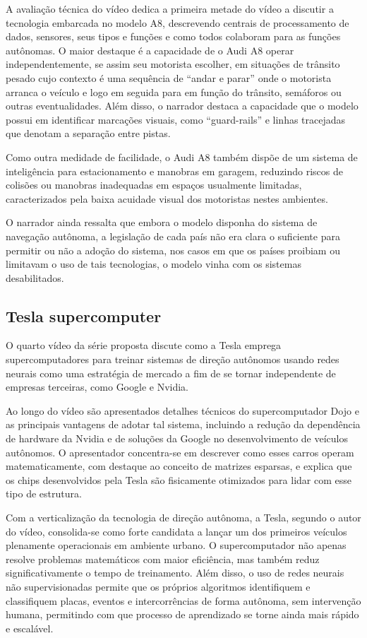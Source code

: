 A avaliação técnica do vídeo dedica a primeira metade do vídeo a discutir a tecnologia embarcada no modelo A8, descrevendo centrais de processamento de dados, sensores, seus tipos e funções e como todos colaboram para as funções autônomas. O maior destaque é a capacidade de o Audi A8 operar independentemente, se assim seu motorista escolher, em situações de trânsito pesado cujo contexto é uma sequência de ``andar e parar'' onde o motorista arranca o veículo e logo em seguida para em função do trânsito, semáforos ou outras eventualidades. Além disso, o narrador destaca a capacidade que o modelo possui em identificar marcações visuais, como ``guard-rails'' e linhas tracejadas que denotam a separação entre pistas.

Como outra medidade de facilidade, o Audi A8 também dispõe de um sistema de inteligência para estacionamento e manobras em garagem, reduzindo riscos de colisões ou manobras inadequadas em espaços usualmente limitadas, caracterizados pela baixa acuidade visual dos motoristas nestes ambientes.

O narrador ainda ressalta que embora o modelo disponha do sistema de navegação autônoma, a legislação de cada país não era clara o suficiente para permitir ou não a adoção do sistema, nos casos em que os países proibiam ou limitavam o uso de tais tecnologias, o modelo vinha com os sistemas desabilitados.

\subsection{Tesla supercomputer}

O quarto vídeo da série proposta \cite{dojo} discute como a Tesla emprega supercomputadores para treinar sistemas de direção autônomos usando redes neurais como uma estratégia de mercado a fim de se tornar independente de empresas terceiras, como Google e Nvidia.

Ao longo do vídeo são apresentados detalhes técnicos do supercomputador Dojo e as principais vantagens de adotar tal sistema, incluindo a redução da dependência de hardware da Nvidia e de soluções da Google no desenvolvimento de veículos autônomos. O apresentador concentra-se em descrever como esses carros operam matematicamente, com destaque ao conceito de matrizes esparsas, e explica que os chips desenvolvidos pela Tesla são fisicamente otimizados para lidar com esse tipo de estrutura.

Com a verticalização da tecnologia de direção autônoma, a Tesla, segundo o autor do vídeo, consolida-se como forte candidata a lançar um dos primeiros veículos plenamente operacionais em ambiente urbano. O supercomputador não apenas resolve problemas matemáticos com maior eficiência, mas também reduz significativamente o tempo de treinamento. Além disso, o uso de redes neurais não supervisionadas permite que os próprios algoritmos identifiquem e classifiquem placas, eventos e intercorrências de forma autônoma, sem intervenção humana, permitindo com que processo de aprendizado se torne ainda mais rápido e escalável.
